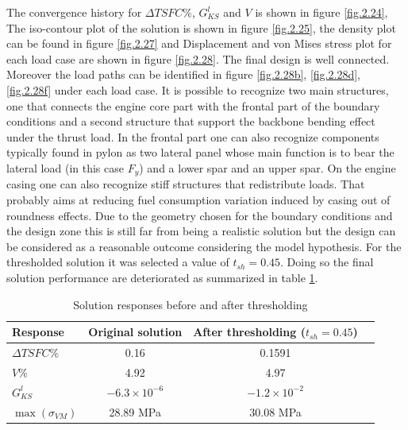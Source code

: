 The convergence history for $\Delta TSFC \%$, $G_{KS}^l$ and $V$ is shown in figure \ref{fig.2.24}, The iso-contour plot of the solution is shown in figure \ref{fig.2.25}, the density plot can be found in figure \ref{fig.2.27} and Displacement and von Mises stress plot for each load case are shown in figure \ref{fig.2.28}. The final design is well connected. Moreover the load paths can be identified in figure \ref{fig.2.28b}, \ref{fig.2.28d}, \ref{fig.2.28f}  under each load case. It is possible to recognize two main structures, one  that connects the engine core part with the frontal part of the boundary conditions and a second structure that support the backbone bending effect under the thrust load. In the frontal part one can also recognize components typically found in pylon as two lateral panel whose main function is to bear the lateral load (in this case $F_y$) and a lower spar and an upper spar. On the engine casing one can also recognize stiff structures that redistribute loads. That probably aims at reducing fuel consumption variation induced by casing out of roundness effects. Due to the geometry chosen for the boundary conditions and the design zone this is still far from being a realistic solution but the design can be considered as a reasonable outcome considering the model hypothesis.  
For the thresholded solution it was selected a value of $t_{sh}=0.45$.
  Doing so the final solution performance are deteriorated as summarized in table \ref{tab:table5}.\\
  \begin{table}[h]
         \caption{\label{tab:table5} Solution responses before and after thresholding }
          \centering
          \begin{tabular}{lccc}
          \hline
           Response& Original solution& After thresholding ($t_{sh}=0.45$) \\\hline
         $\Delta TSFC \%$ & 0.16 & 0.1591 \\
         $V \%$ & 4.92 & 4.97 \\
         $G_{KS}^l$ & $-6.3\times 10^{-6}$ & $-1.2\times 10^{-2}$ \\
         $\max(\sigma_{VM})$ & 28.89 MPa & 30.08 MPa \\
          \hline
          \end{tabular}
          \end{table}
